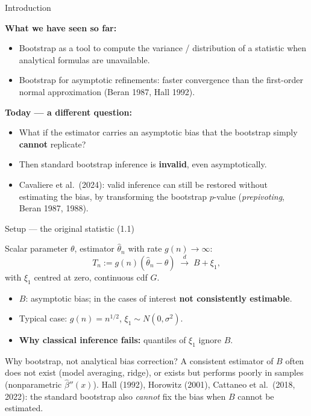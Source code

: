 \documentclass[10pt,aspectratio=169]{beamer}
\theoremstyle{plain}
\newcommand{\dto}{\xrightarrow{d}}
\newcommand{\Tn}{T_{n}}
\newcommand{\thn}{\hat{\theta}_{n}}
\begin{document}
\begin{frame}{Introduction}

  \textbf{What we have seen so far:}
  \begin{itemize}
    \setlength{\itemsep}{6pt}
    \item Bootstrap as a tool to \alert{compute the variance / distribution} of
      a statistic when analytical formulas are unavailable.
    \item Bootstrap for \alert{asymptotic refinements}: faster convergence than the
      first-order normal approximation (Beran 1987, Hall 1992).
  \end{itemize}

  \medskip

  \textbf{Today --- a different question:}
  \begin{itemize}
    \setlength{\itemsep}{6pt}
    \item What if the estimator carries an \alert{asymptotic bias} that the
      bootstrap simply \textbf{cannot} replicate?
    \item Then standard bootstrap inference is \textbf{invalid}, even
      asymptotically.
    \item Cavaliere et al.\ (2024): valid inference can still be restored
      \alert{without estimating the bias}, by transforming the bootstrap
      $p$-value (\textit{prepivoting}, Beran 1987, 1988).
  \end{itemize}

\end{frame}


\begin{frame}{Setup --- the original statistic (1.1)}

  Scalar parameter $\theta$, estimator $\thn$ with rate $g(n)\to\infty$:
  \[
    \Tn := g(n)(\thn - \theta) \;\dto\; B + \xi_1,
    \tag{1.1}
  \]
  with $\xi_1$ centred at zero, continuous cdf $G$.

  \medskip

  \begin{itemize}
    \setlength{\itemsep}{6pt}
    \item $B$: \alert{asymptotic bias}; in the cases of interest \textbf{not consistently estimable}.
    \item Typical case: $g(n) = n^{1/2}$, $\xi_1 \sim N(0,\sigma^2)$.
    \item \textbf{Why classical inference fails:} quantiles of $\xi_1$ ignore $B$.
  \end{itemize}

  \medskip

  \begin{block}{Why bootstrap, not analytical bias correction?}
    A consistent estimator of $B$ often does not exist (model averaging, ridge),
    or exists but performs poorly in samples (nonparametric $\hat\beta''(x)$).
    Hall (1992), Horowitz (2001), Cattaneo et al.\ (2018, 2022): the standard
    bootstrap also \textit{cannot} fix the bias when $B$ cannot be estimated.
  \end{block}

\end{frame}
\end{document}
